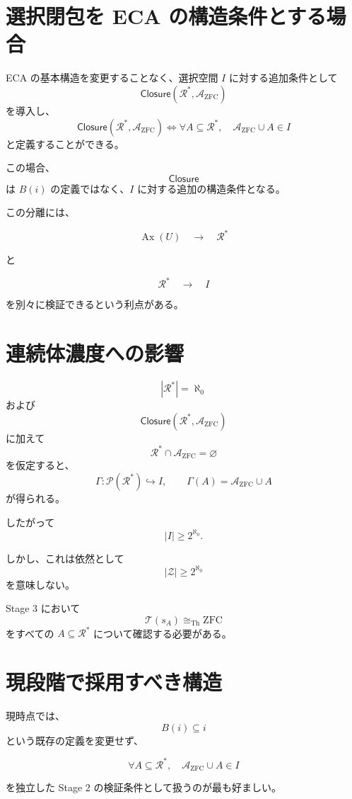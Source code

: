 \documentclass[a4paper,11pt]{article}
\begin{document}
\section{選択閉包を ECA の構造条件とする場合}

ECA の基本構造を変更することなく、選択空間 $I$ に対する追加条件として
\[
\mathsf{Closure}(\mathcal{R}^*,\mathcal{A}_{\mathrm{ZFC}})
\]
を導入し、
\[
\mathsf{Closure}(\mathcal{R}^*,\mathcal{A}_{\mathrm{ZFC}})
\iff
\forall A\subseteq\mathcal{R}^*,
\quad
\mathcal{A}_{\mathrm{ZFC}}\cup A\in I
\]
と定義することができる。

この場合、
\[
\mathsf{Closure}
\]
は $B(i)$ の定義ではなく、$I$ に対する追加の構造条件となる。

この分離には、

\[
\operatorname{Ax}(U)
\quad\longrightarrow\quad
\mathcal{R}^*
\]

と

\[
\mathcal{R}^*
\quad\longrightarrow\quad
I
\]

を別々に検証できるという利点がある。

\section{連続体濃度への影響}

\[
|\mathcal{R}^*|=\aleph_0
\]
および
\[
\mathsf{Closure}(\mathcal{R}^*,\mathcal{A}_{\mathrm{ZFC}})
\]
に加えて
\[
\mathcal{R}^*\cap\mathcal{A}_{\mathrm{ZFC}}=\varnothing
\]
を仮定すると、
\[
\Gamma:
\mathcal{P}(\mathcal{R}^*)\hookrightarrow I,
\qquad
\Gamma(A)=\mathcal{A}_{\mathrm{ZFC}}\cup A
\]
が得られる。

したがって
\[
|I|\ge2^{\aleph_0}.
\]

しかし、これは依然として
\[
|\mathcal Z|\ge2^{\aleph_0}
\]
を意味しない。

Stage 3 において
\[
\mathcal T(s_A)\cong_{\mathrm{Th}}\mathrm{ZFC}
\]
をすべての $A\subseteq\mathcal{R}^*$ について確認する必要がある。

\section{現段階で採用すべき構造}

現時点では、
\[
B(i)\subseteq i
\]
という既存の定義を変更せず、

\[
\boxed{
\forall A\subseteq\mathcal{R}^*,
\quad
\mathcal{A}_{\mathrm{ZFC}}\cup A\in I
}
\]

を独立した Stage 2 の検証条件として扱うのが最も好ましい。
\end{document}
